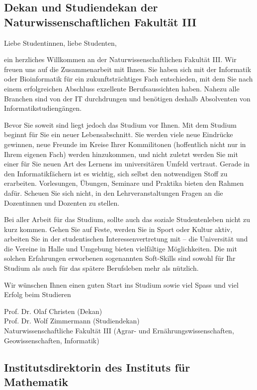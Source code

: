 \subsection{Dekan und Studiendekan der Naturwissenschaftlichen Fakultät III}

Liebe Studentinnen, liebe Studenten,

ein herzliches Willkommen an der Naturwissenschaftlichen Fakultät III.
Wir freuen uns auf die Zusammenarbeit mit Ihnen.
Sie haben sich mit der Informatik oder Bioinformatik für ein zukunftsträchtiges Fach entschieden, mit dem Sie nach einem erfolgreichen Abschluss exzellente Berufsaussichten haben.
Nahezu alle Branchen sind von der IT durchdrungen und benötigen deshalb Absolventen von Informatikstudiengängen.

Bevor Sie soweit sind liegt jedoch das Studium vor Ihnen.
Mit dem Studium beginnt für Sie ein neuer Lebensabschnitt.
Sie werden viele neue Eindrücke gewinnen, neue Freunde im Kreise Ihrer Kommilitonen (hoffentlich nicht nur in Ihrem eigenen Fach) werden hinzukommen, und nicht zuletzt werden Sie mit einer für Sie neuen Art des Lernens im universitären Umfeld vertraut.
Gerade in den Informatikfächern ist es wichtig, sich selbst den notwendigen Stoff zu erarbeiten.
Vorlesungen, Übungen, Seminare und Praktika bieten den Rahmen dafür.
Scheuen Sie sich nicht, in den Lehrveranstaltungen Fragen an die Dozentinnen und Dozenten zu stellen. 

Bei aller Arbeit für das Studium, sollte auch das soziale Studentenleben nicht zu kurz kommen. Gehen Sie auf Feste, werden Sie in Sport oder Kultur aktiv, arbeiten Sie in der studentischen Interessenvertretung mit -- die Universität und die Vereine in Halle und Umgebung bieten vielfältige Möglichkeiten.
Die mit solchen Erfahrungen erworbenen sogenannten Soft-Skills sind sowohl für Ihr Studium als auch für das spätere Berufsleben mehr als nützlich.

Wir wünschen Ihnen einen guten Start ins Studium sowie viel Spass und viel Erfolg beim Studieren

Prof. Dr. Olaf Christen (Dekan)\\
Prof. Dr. Wolf Zimmermann (Studiendekan)\\
Naturwissenschaftliche Fakultät III (Agrar- und Ernährungswissenschaften, \newline Geowissenschaften, Informatik)


\subsection{Institutsdirektorin des Instituts für Mathematik}

